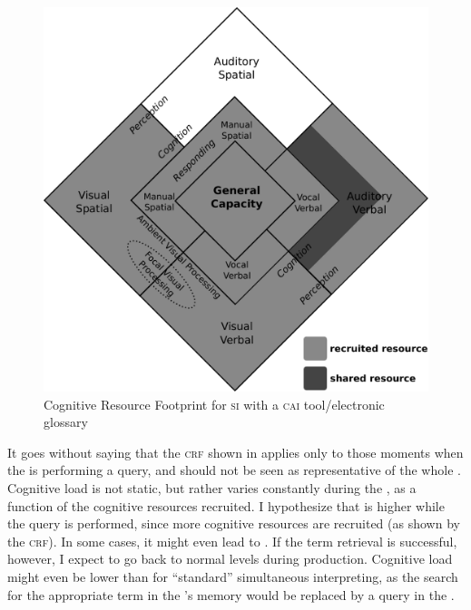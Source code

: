 \documentclass[output=paper]{langsci/langscibook}
\begin{document}
\begin{figure}[t]
	\includegraphics[height=.4\textheight]{figures/fig2-5.pdf}
\caption{\label{fig:prandi:5}Cognitive Resource Footprint for \textsc{si} with a \textsc{cai} tool/electronic glossary}
\end{figure}

It goes without saying that the \textsc{crf} shown in  applies only to those moments when the  is performing a query, and should not be seen as representative of the whole . Cognitive load is not static, but rather varies constantly during the , as a function of the cognitive resources recruited. I hypothesize that  is higher while the query is performed, since more cognitive resources are recruited (as shown by the \textsc{crf}). In some cases, it might even lead to . If the term retrieval is successful, however, I expect  to go back to normal levels during production. Cognitive load might even be lower than for ``standard'' simultaneous interpreting, as the search for the appropriate term in the ’s memory would be replaced by a query in the .
\end{document}
